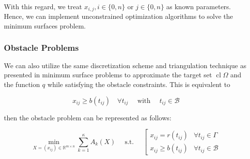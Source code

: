 With this regard, we treat $x_{i, j}, i \in\{0, n\}$ or $j \in\{0, n\}$ as known parameters. Hence, we can implement unconstrained optimization algorithms to solve the minimum surfaces problem.
\subsubsection{Obstacle Problems}
We can also utilize the same discretization scheme and triangulation technique as presented in minimum surface problems to approximate the target set $\operatorname{cl} \Omega$ and the function $q$ while satisfying the obstacle constraints. This is equivalent to 

\begin{equation}
x_{i j} \geq b\left(t_{i j}\right) \quad \forall t_{i j} \quad \text { with } \quad t_{i j} \in \mathcal{B}
\end{equation}

then the obstacle problem can be represented as follows:

\begin{equation}
\min _{X=\left(x_{i j}\right) \in \mathbb{R}^{m \times n}} \sum_{k=1}^{\kappa} A_{k}(X) \quad \text { s.t. } \quad\left[\begin{array}{ll}
x_{i j}=r\left(t_{i j}\right) & \forall t_{i j} \in \Gamma \\
x_{i j} \geq b\left(t_{i j}\right) & \forall t_{i j} \in \mathcal{B}
\end{array}\right.
\end{equation}


